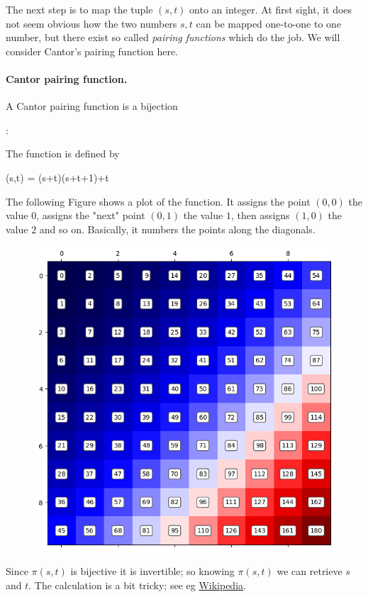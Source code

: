 The next step is to map the tuple $(s,t)$ onto an integer. At first sight, it does not seem obvious how the two numbers $s, t$ can be mapped one-to-one to one number, but there exist so called \emph{pairing functions} which do the job. We will consider Cantor's pairing function here.

\paragraph{Cantor pairing function.} A Cantor pairing function is a bijection

\bee
\pi: \Nc \times \Nc \rightarrow \Nc
\eee

The function is defined by

\bee
\pi(s,t) = (s+t)(s+t+1)+t
\eee

The following Figure shows a plot of the function. It assigns the point $(0,0)$ the value $0$, assigns the "next" point $(0,1)$ the value $1$, then assigns $(1,0)$ the value $2$ and so on. Basically, it numbers the points along the diagonals.

\begin{figure}[H]
    \centering
    \includegraphics[scale=0.5]{images/2023_04_12_cantor.png}
\end{figure}

Since $\pi(s,t)$ is bijective it is invertible; so knowing $\pi(s,t)$ we can retrieve $s$ and $t$. The calculation is a bit tricky; see eg \href{https://en.m.wikipedia.org/wiki/Pairing_function}{Wikipedia}.


